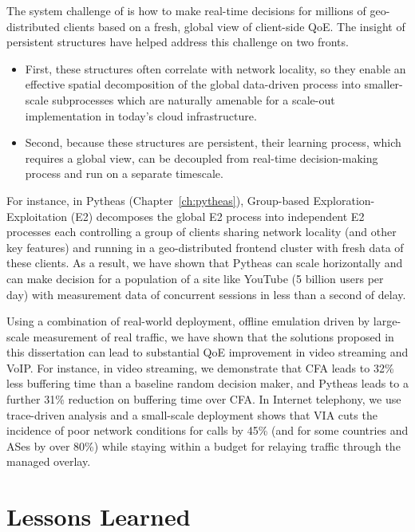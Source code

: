 The system challenge of \ddn is how to make real-time decisions
for millions of geo-distributed clients based on a fresh, global
view of client-side QoE.
The insight of persistent structures have helped address
this challenge on two fronts.
\begin{itemize}
\item First,  these structures often correlate with network locality,
so they enable an effective spatial decomposition of the global 
data-driven process
into smaller-scale subprocesses which are naturally amenable for 
a scale-out implementation in today's cloud infrastructure.
\item Second, because these structures are persistent, their 
learning process, which requires a global view, can be decoupled
from real-time decision-making process and run on a separate
timescale.
\end{itemize}
For instance, in Pytheas (Chapter~\ref{ch:pytheas}), Group-based 
Exploration-Exploitation (E2) decomposes the global E2 process
into independent E2 processes each controlling a group of 
clients sharing network locality (and other key features)
and running in a geo-distributed frontend
cluster with fresh data of these clients.
As a result, we have shown that Pytheas can scale horizontally 
and can make decision for a population of a site like YouTube (5
billion users per day) with measurement data of 
concurrent sessions in less than a second of delay.


Using a combination of real-world deployment, offline emulation
driven by large-scale measurement of real traffic, we have shown
that the solutions proposed in this dissertation can lead to substantial 
QoE improvement in video streaming and VoIP. 
For instance, in video streaming, we demonstrate that CFA leads to  
32\% less buffering time than a baseline random decision maker,
and Pytheas leads to a further 31\% reduction on buffering time
over CFA.
In Internet telephony, we use trace-driven analysis
and a small-scale deployment shows that VIA cuts the incidence
of poor network conditions for calls by 45\% (and for
some countries and ASes by over 80\%) while staying within
a budget for relaying traffic through the managed overlay.



\section{Lessons Learned}


